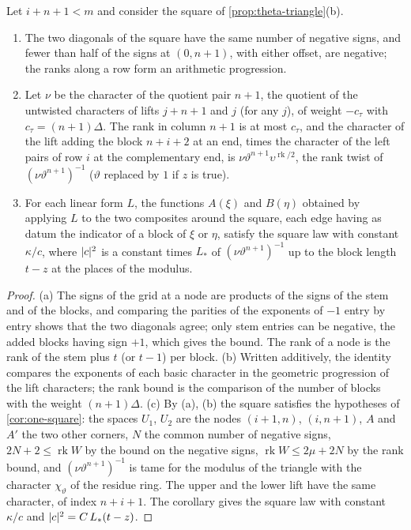 \begin{lemma}\label{lem:square-hyp}
Let $i+n+1<m$ and consider the square of \cref{prop:theta-triangle}(b).
\begin{enumerate}[label=\textup{(\alph*)}]
\item The two diagonals of the square have the same number of negative signs, and fewer than half of the signs at $(0,n+1)$, with either offset, are negative; the ranks along a row form an arithmetic
progression.
\item Let $\nu$ be the character of the quotient pair $n+1$, the quotient of the untwisted characters of lifts $j+n+1$ and $j$ (for any $j$), of weight $-c_\tau$ with $c_\tau=(n+1)\Delta$. The rank in column $n+1$
is at most $c_\tau$, and the character of the lift adding the block $n+i+2$ at an end, times the character of the left pairs of row $i$ at the complementary end, is $\nu\vartheta^{n+1}\upsilon^{\operatorname{rk}/2}$, the rank
twist of $(\nu\vartheta^{n+1})^{-1}$ ($\vartheta$ replaced by $1$ if $z$ is true).
\item For each linear form $L$, the functions $A(\xi)$ and $B(\eta)$ obtained by applying $L$ to the two composites around the square, each edge having as datum the indicator of a block of $\xi$ or $\eta$, satisfy the square
law with constant $\kappa/c$, where $\lvert c\rvert^2$ is a constant times $L_*$ of $(\nu\vartheta^{n+1})^{-1}$ up to the block length $t-z$ at the places of the modulus.
\end{enumerate}
\end{lemma}

\begin{proof}
(a) The signs of the grid at a node are products of the signs of the stem and of the blocks, and comparing the parities of the exponents of $-1$ entry by entry shows that the two diagonals agree; only stem
entries can be negative, the added blocks having sign $+1$, which gives the bound. The rank of a node is the rank of the stem plus $t$ (or $t-1$) per block. (b) Written additively, the identity compares the
exponents of each basic character in the geometric progression of the lift characters; the rank bound is the comparison of the number of blocks with the weight $(n+1)\Delta$. (c) By (a), (b) the square
satisfies the hypotheses of \cref{cor:one-square}: the spaces $U_1$, $U_2$ are the nodes $(i+1,n)$, $(i,n+1)$, $A$ and $A'$ the two other corners, $N$ the common number of negative signs, $2N+2\le\operatorname{rk}W$ by the
bound on the negative signs, $\operatorname{rk}W\le2\mu+2N$ by the rank bound, and $(\nu\vartheta^{n+1})^{-1}$ is tame for the modulus of the triangle with the character $\chi_\vartheta$ of the residue ring. The upper and the lower
lift have the same character, of index $n+i+1$. The corollary gives the square law with constant $\kappa/c$ and $\lvert c\rvert^2=C\,L_*(t-z)$.
\end{proof}


